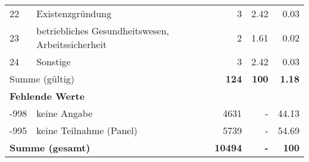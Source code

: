 \begin{longtable}{lXrrr}
        22 & \multicolumn{1}{X}{Existenzgründung} & %
          \num{3} &
          \num[round-mode=places,round-precision=2]{2.42} &
          \num[round-mode=places,round-precision=2]{0.03} \\

        23 & \multicolumn{1}{X}{betriebliches Gesundheitswesen, Arbeitssicherheit} & %
          \num{2} &
          \num[round-mode=places,round-precision=2]{1.61} &
          \num[round-mode=places,round-precision=2]{0.02} \\

        24 & \multicolumn{1}{X}{Sonstige} & %
          \num{3} &
          \num[round-mode=places,round-precision=2]{2.42} &
          \num[round-mode=places,round-precision=2]{0.03} \\

     \midrule
     \multicolumn{2}{l}{Summe (gültig)} &
       \textbf{\num{124}} &
     \textbf{\num{100}} &
       \textbf{\num[round-mode=places,round-precision=2]{1.18}} \\
     \multicolumn{5}{l}{\textbf{Fehlende Werte}}\\
       -998 &
       keine Angabe &
         \num{4631} &
        - &
         \num[round-mode=places,round-precision=2]{44.13} \\
       -995 &
       keine Teilnahme (Panel) &
         \num{5739} &
        - &
         \num[round-mode=places,round-precision=2]{54.69} \\
     \midrule
     \multicolumn{2}{l}{\textbf{Summe (gesamt)}} &
          \textbf{\num{10494}} &
        \textbf{-} &
        \textbf{\num{100}} \\
     \bottomrule
     \end{longtable}
     
